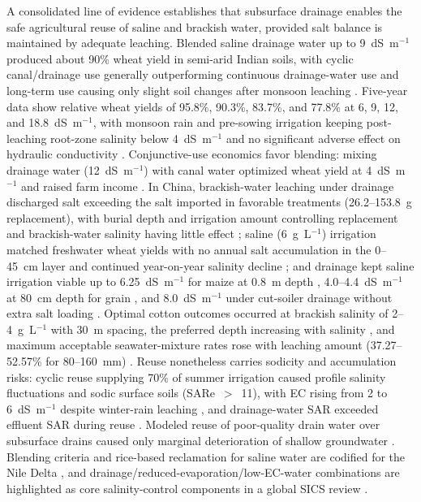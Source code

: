 A consolidated line of evidence establishes that subsurface drainage enables the safe agricultural reuse of saline and brackish water, provided salt balance is maintained by adequate leaching. Blended saline drainage water up to 9~dS~m$^{-1}$ produced about 90\% wheat yield in semi-arid Indian soils, with cyclic canal/drainage use generally outperforming continuous drainage-water use and long-term use causing only slight soil changes after monsoon leaching \parencite{Sharma2004}. Five-year data show relative wheat yields of 95.8\%, 90.3\%, 83.7\%, and 77.8\% at 6, 9, 12, and 18.8~dS~m$^{-1}$, with monsoon rain and pre-sowing irrigation keeping post-leaching root-zone salinity below 4~dS~m$^{-1}$ and no significant adverse effect on hydraulic conductivity \parencite{Sharma1998}. Conjunctive-use economics favor blending: mixing drainage water (12~dS~m$^{-1}$) with canal water optimized wheat yield at 4~dS~m$^{-1}$ and raised farm income \parencite{AGNIHOTRI1992}. In China, brackish-water leaching under drainage discharged salt exceeding the salt imported in favorable treatments (26.2--153.8~g replacement), with burial depth and irrigation amount controlling replacement and brackish-water salinity having little effect \parencite{Li2023}; saline (6~g~L$^{-1}$) irrigation matched freshwater wheat yields with no annual salt accumulation in the 0--45~cm layer and continued year-on-year salinity decline \parencite{Gao2023}; and drainage kept saline irrigation viable up to 6.25~dS~m$^{-1}$ for maize at 0.8~m depth \parencite{Feng2017}, 4.0--4.4~dS~m$^{-1}$ at 80~cm depth for grain \parencite{Feng2021}, and 8.0~dS~m$^{-1}$ under cut-soiler drainage without extra salt loading \parencite{Neha2022}. Optimal cotton outcomes occurred at brackish salinity of 2--4~g~L$^{-1}$ with 30~m spacing, the preferred depth increasing with salinity \parencite{Li2024}, and maximum acceptable seawater-mixture rates rose with leaching amount (37.27--52.57\% for 80--160~mm) \parencite{Lu2019}. Reuse nonetheless carries sodicity and accumulation risks: cyclic reuse supplying 70\% of summer irrigation caused profile salinity fluctuations and sodic surface soils (SARe~$>$~11), with EC rising from 2 to 6~dS~m$^{-1}$ despite winter-rain leaching \parencite{Mitchell2000}, and drainage-water SAR exceeded effluent SAR during reuse \parencite{Jayawardane2001}. Modeled reuse of poor-quality drain water over subsurface drains caused only marginal deterioration of shallow groundwater \parencite{KARAJEH1994c}. Blending criteria and rice-based reclamation for saline water are codified for the Nile Delta \parencite{Kotb2000}, and drainage/reduced-evaporation/low-EC-water combinations are highlighted as core salinity-control components in a global SICS review \parencite{Cuevas2019}.

